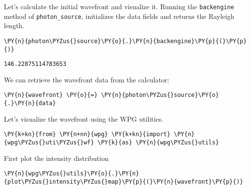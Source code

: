     Let's calculate the initial wavefront and visualize it. Running the
\texttt{backengine} method of \texttt{photon\_source}, initializes the
data fields and returns the Rayleigh length.

    \begin{tcolorbox}[breakable, size=fbox, boxrule=1pt, pad at break*=1mm,colback=cellbackground, colframe=cellborder]
\begin{Verbatim}[commandchars=\\\{\}]
\PY{n}{photon\PYZus{}source}\PY{o}{.}\PY{n}{backengine}\PY{p}{(}\PY{p}{)}
\end{Verbatim}
\end{tcolorbox}

    \begin{Verbatim}[commandchars=\\\{\}]
146.22875114783653
    \end{Verbatim}

    We can retrieve the wavefront data from the calculator:

    \begin{tcolorbox}[breakable, size=fbox, boxrule=1pt, pad at break*=1mm,colback=cellbackground, colframe=cellborder]
\begin{Verbatim}[commandchars=\\\{\}]
\PY{n}{wavefront} \PY{o}{=} \PY{n}{photon\PYZus{}source}\PY{o}{.}\PY{n}{data}
\end{Verbatim}
\end{tcolorbox}

    Let's visualize the wavefront using the WPG utilities.

    \begin{tcolorbox}[breakable, size=fbox, boxrule=1pt, pad at break*=1mm,colback=cellbackground, colframe=cellborder]
\begin{Verbatim}[commandchars=\\\{\}]
\PY{k+kn}{from} \PY{n+nn}{wpg} \PY{k+kn}{import} \PY{n}{wpg\PYZus{}uti\PYZus{}wf} \PY{k}{as} \PY{n}{wpg\PYZus{}utils}
\end{Verbatim}
\end{tcolorbox}

    First plot the intensity distribution

    \begin{tcolorbox}[breakable, size=fbox, boxrule=1pt, pad at break*=1mm,colback=cellbackground, colframe=cellborder]
\begin{Verbatim}[commandchars=\\\{\}]
\PY{n}{wpg\PYZus{}utils}\PY{o}{.}\PY{n}{plot\PYZus{}intensity\PYZus{}map}\PY{p}{(}\PY{n}{wavefront}\PY{p}{)}
\end{Verbatim}
\end{tcolorbox}

